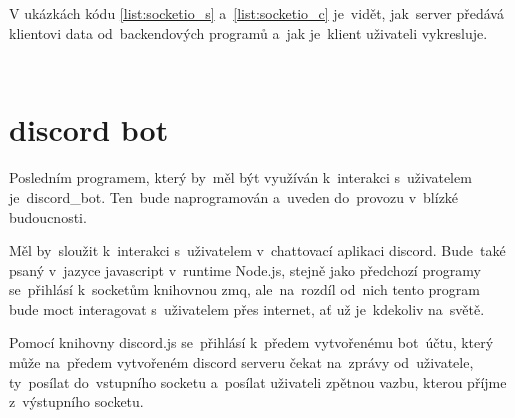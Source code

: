 V ukázkách kódu \ref{list:socketio_s} a~\ref{list:socketio_c} je~vidět, jak~server předává klientovi data od~backendových programů a~jak je~klient uživateli vykresluje.
\begin{code}
    \inputminted[frame=lines,fontsize=\footnotesize{}, linenos, breaklines]{js}{code_examples/socketio_server.js}
\end{code}
\begin{code}
    \inputminted[frame=lines,fontsize=\footnotesize{}, linenos, breaklines]{js}{code_examples/socketio_client.js}
\end{code}



\section{discord bot}

Posledním programem, který by~měl být využíván k~interakci s~uživatelem je~discord\_bot. Ten~bude naprogramován a~uveden do~provozu v~blízké budoucnosti.

Měl by~sloužit k~interakci s~uživatelem v~chattovací aplikaci discord. Bude~také psaný v~jazyce javascript v~runtime Node.js, stejně jako předchozí programy se~přihlásí k~socketům knihovnou zmq, ale~na~rozdíl od~nich tento program bude moct interagovat s~uživatelem přes internet, ať už je~kdekoliv na~světě.

Pomocí knihovny discord.js se~přihlásí k~předem vytvořenému bot~účtu, který může na~předem vytvořeném discord serveru čekat na~zprávy od~uživatele, ty~posílat do~vstupního socketu a~posílat uživateli zpětnou vazbu, kterou příjme z~výstupního socketu.
